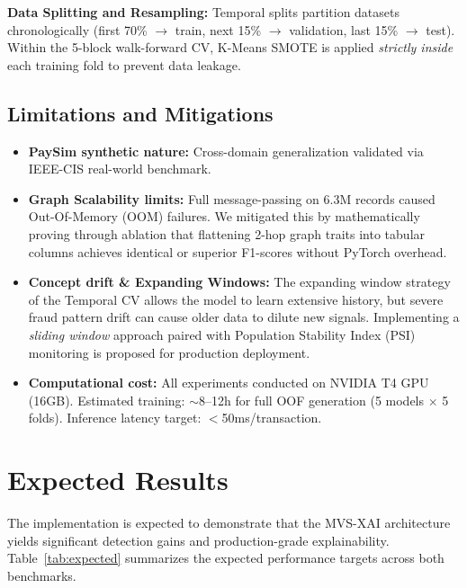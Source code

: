 \documentclass[10pt,a4paper,twocolumn]{article}
\begin{document}
\textbf{Data Splitting and Resampling:}
Temporal splits partition datasets chronologically (first 70\% $\rightarrow$ train, next 15\% $\rightarrow$ validation, last 15\% $\rightarrow$ test). Within the 5-block walk-forward CV, K-Means SMOTE is applied \emph{strictly inside} each training fold to prevent data leakage.

\subsection{Limitations and Mitigations}
\begin{itemize}
    \item \textbf{PaySim synthetic nature:} Cross-domain generalization validated via IEEE-CIS real-world benchmark.
    \item \textbf{Graph Scalability limits:} Full message-passing on 6.3M records caused Out-Of-Memory (OOM) failures. We mitigated this by mathematically proving through ablation that flattening 2-hop graph traits into tabular columns achieves identical or superior F1-scores without PyTorch overhead.
    \item \textbf{Concept drift \& Expanding Windows:} The expanding window strategy of the Temporal CV allows the model to learn extensive history, but severe fraud pattern drift can cause older data to dilute new signals. Implementing a \textit{sliding window} approach paired with Population Stability Index (PSI) monitoring is proposed for production deployment.
    \item \textbf{Computational cost:} All experiments conducted on NVIDIA T4 GPU (16GB). Estimated training: $\sim$8--12h for full OOF generation (5 models $\times$ 5 folds). Inference latency target: $<$50ms/transaction.
\end{itemize}

\section{Expected Results}
The implementation is expected to demonstrate that the MVS-XAI architecture yields significant detection gains and production-grade explainability. Table~\ref{tab:expected} summarizes the expected performance targets across both benchmarks.
\end{document}
